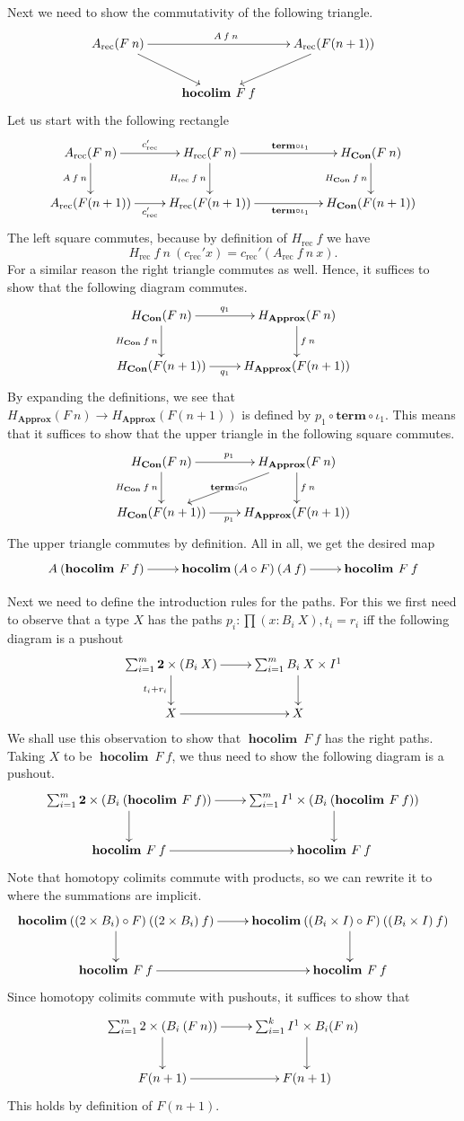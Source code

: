 \documentclass[a4paper,UKenglish]{lipics-v2016}
\newcommand{\two}[0]{\textbf{2}}
\newcommand{\rec}[0]{\operatorname{rec}}
\newcommand{\term}[0]{\textbf{term}}
\newcommand{\Con}[0]{\textbf{Con}}
\newcommand{\Approx}[0]{\textbf{Approx}}
\newcommand{\hocolim}[0]{\operatorname{\textbf{hocolim}}}
\begin{document}
Next we need to show the commutativity of the following triangle.
\[
\xymatrix
{
	A_{\rec}(F \> n) \ar[rr]^{A \> f \> n} \ar[dr] & & A_{\rec}(F(n+1)) \ar[dl] \\
	& \hocolim \> F \> f &
}
\]
Let us start with the following rectangle
\[
\xymatrix
{
	A_{\rec}(F \> n) \ar[r]^-{c_{\rec}'} \ar[d]_{A \> f \> n} 
		& H_{\rec}(F \> n) \ar[rr]^{\term \circ \iota_1} \ar[d]_{H_{\rec} \> f \> n} &
		& H_{\Con}(F \> n) \ar[d]_{H_{\Con} \> f \> n}\\
	A_{\rec}(F(n+1)) \ar[r]_-{c_{\rec}'} 
		& H_{\rec}(F(n+1)) \ar[rr]_{\term \circ \iota_1} &
		& H_{\Con}(F(n+1))
}
\]
The left square commutes, because by definition of $H_{\rec} \> f$ we have
\[
H_{\rec} \> f \> n \> (c_{\rec}' x) = c_{\rec}' (A_{\rec} \> f \> n \> x).
\]
For a similar reason the right triangle commutes as well.
Hence, it suffices to show that the following diagram commutes.
\[
\xymatrix
{
	H_{\Con}(F \> n) \ar[d]_{H_{\Con} \> f \> n} \ar[r]^-{q_1}
		& H_{\Approx}(F \> n) \ar[d]^{f \> n}\\
	H_{\Con}(F(n+1)) \ar[r]_-{q_1}
		& H_{\Approx}(F(n+1))
}
\]
By expanding the definitions, we see that $H_{\Approx}(F \> n) \rightarrow H_{\Approx}(F(n+1))$ is defined by $p_1 \circ \term \circ \iota_1$.
This means that it suffices to show that the upper triangle in the following square commutes.
\[
\xymatrix
{
	H_{\Con}(F \> n) \ar[d]_{H_{\Con} \> f \> n} \ar[r]^{p_1}
	& H_{\Approx}(F \> n) \ar[d]^{f \> n} \ar[dl]|{\term \circ \iota_0}\\
	H_{\Con}(F(n+1)) \ar[r]_{p_1}
	& H_{\Approx}(F(n+1))
}
\]
The upper triangle commutes by definition.
All in all, we get the desired map
\[
\xymatrix
{
	A \> (\hocolim \> F \> f) \ar[r] & \hocolim \> (A \circ F) \> (A \> f) \ar[r] & \hocolim \> F \> f
}
\]

Next we need to define the introduction rules for the paths.
For this we first need to observe that a type $X$ has the paths $p_i : \prod (x : B_i \> X), t_i = r_i$ iff the following diagram is a pushout
\[
\xymatrix
{
	\sum_{i = 1}^m \two \times (B_i \> X) \ar[r] \ar[d]_{t_i + r_i} & \sum_{i = 1}^m B_i \> X \times I^1 \ar[d]\\
	X \ar[r] & X
}
\]
We shall use this observation to show that $\hocolim \> F \> f$ has the right paths.
Taking $X$ to be $\hocolim \> F \> f$, we thus need to show the following diagram is a pushout.
\[
\xymatrix
{
	\sum_{i = 1}^m \two \times (B_i \> (\hocolim \> F \> f)) \ar[r] \ar[d] & \sum_{i = 1}^m I^1 \times (B_i \> (\hocolim \> F \> f)) \ar[d]\\
	\hocolim \> F \> f \ar[r] & \hocolim \> F \> f
}
\]
Note that homotopy colimits commute with products, so we can rewrite it to where the summations are implicit.
\[
\xymatrix
{
	\hocolim \> ((2 \times B_i) \circ F) \> ((2 \times B_i) \> f) \ar[r] \ar[d] & \hocolim \> ((B_i \times I) \circ F) \> ((B_i \times I) \> f) \ar[d]\\
	\hocolim \> F \> f \ar[r] & \hocolim \> F \> f
}
\]
Since homotopy colimits commute with pushouts, it suffices to show that
\[
\xymatrix
{
	\sum_{i=1}^m 2 \times (B_i \> (F \> n)) \ar[r] \ar[d] & \sum_{i=1}^k I^1 \times B_i (F \> n) \ar[d]\\
	F(n+1) \ar[r] & F(n+1)
}
\]
This holds by definition of $F(n+1)$.
\end{document}
